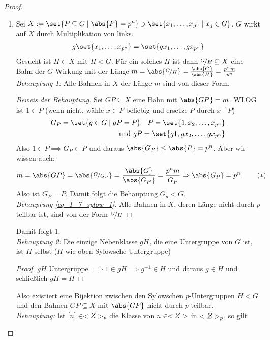 \begin{proof}
	\begin{enumerate}
		\item Sei $X := \set{P \subseteq G \mid \abs{P} = p^n} \ni \set{x_1, \dots, x_{p^n} \mid x_j \in G}$. $G$ wirkt auf $X$ durch Multiplikation von links.
		\begin{align*}
		g \set{x_1, \dots, x_{p^n}} = \set{gx_1, \dots, gx_{p^n}}
		\end{align*}
		Gesucht ist $H \subset X$ mit $H < G$. Für ein solches $H$ ist dann $\lnkset{G}{H} \subseteq X$ eine Bahn der $G$-Wirkung mit der Länge $m = \abs{\lnkset{G}{H}} = \frac{\abs{G}}{\abs{H}} = \frac{p^n m}{p^n}$\\
		\emph{Behauptung 1:} Alle Bahnen in $X$ der Länge $m$ sind von dieser Form.
		\begin{proof}[Beweis der Behauptung]
			Sei $GP \subseteq X$ eine Bahn mit $\abs{GP} = m$. WLOG ist $1 \in P$ (wenn nicht, wähle $x \in P$ beliebig und ersetze $P$ durch $x^{-1}P$)
			\begin{align*}
			G_P = \set{g \in G \mid gP = P}\quad P = \set{1, x_2, \dots, x_{p^n}}\\
			\und gP = \set{g1, gx_2, \dots, gx_{p^n}}
			\end{align*}
			Also $1 \in P \implies G_P \subset P$ und daraus $\abs{G_P} \le \abs{P} = p^n$. Aber wir wissen auch:
			\begin{align*}
			m = \abs{GP} = \abs{\lnkset{G}{G_P}} = \frac{\abs{G}}{\abs{G_P}} = \frac{p^n m}{G_P} \implies \abs{G_P} = p^n.\tag{$\ast$}\label{eq_1_7_sylow_1}
			\end{align*}
			Also ist $G_P = P$. Damit folgt die Behauptung $G_p < G$.\\
			\emph{Behauptung \eqref{eq_1_7_sylow_1}:} Alle Bahnen in $X$, deren Länge nicht durch $p$ teilbar ist, sind von der Form $\lnkset{G}{H}$
		\end{proof}
		Damit folgt 1.\\
		\emph{Behauptung 2:} Die einzige Nebenklasse $gH$, die eine Untergruppe von $G$ ist, ist $H$ selbst ($H$ wie oben Sylowsche Untergruppe)
		\begin{proof}
			$gH$ Untergruppe $\implies 1 \in gH \implies g^{-1} \in H$ und daraus $g \in H$ und schließlich $gH = H$
		\end{proof}
		Also existiert eine Bijektion zwischen den Sylowschen $p$-Untergruppen $H < G$ und den Bahnen $GP \subseteq X$ mit $\abs{GP}$ nicht durch $p$ teilbar.\\
		\emph{Behauptung:} Ist $[n]\in <Z>_p$ die Klasse von $n \in <Z>$ in $<Z>_p$, so gilt

\end{enumerate}
\end{proof}
